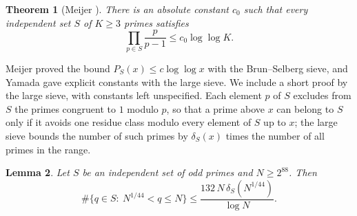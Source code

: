 \documentclass[screen,reqno]{aomart}
\numberwithin{equation}{section}
\theoremstyle{plain}
\newtheorem{theorem}{Theorem}[section]
\newtheorem{lemma}[theorem]{Lemma}
\theoremstyle{definition}
\theoremstyle{remark}
\begin{document}
\begin{theorem}[Meijer \cite{Mei74}]\label{thm:sieve}
There is an absolute constant $c_0$ such that every independent set
$S$ of $K\ge3$ primes satisfies
\[
  \prod_{p\in S}\frac p{p-1}\le c_0\log\log K .
\]
\end{theorem}

Meijer proved the bound $P_S(x)\le c\log\log x$ with the
Brun--Selberg sieve, and Yamada \cite{Yam23} gave explicit constants
with the large sieve. We include a short proof by the large sieve,
with constants left unspecified. Each element $p$ of $S$ excludes
from $S$ the primes congruent to $1$ modulo $p$, so that a prime above
$x$ can belong to $S$ only if it avoids one residue class modulo every
element of $S$ up to $x$; the large sieve bounds the number of such
primes by $\delta_S(x)$ times the number of all primes in the range.

\begin{lemma}\label{lem:sievestep}
Let $S$ be an independent set of odd primes and $N\ge2^{88}$. Then
\[
  \#\{q\in S:\ N^{1/44}<q\le N\}\le\frac{132\,N\,\delta_S(N^{1/44})}{\log N}.
\]
\end{lemma}
\end{document}
